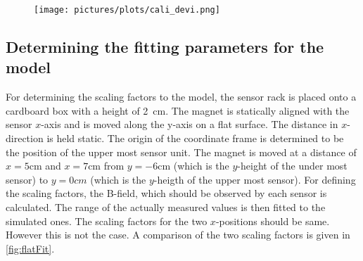 \begin{figure}
\centering
\texttt{[image: pictures/plots/cali\_devi.png]}\label{fig:devi}
\caption{}
\end{figure}





\subsection{Determining the fitting parameters for the model} \label{subsec:resModelFit}

For determining the scaling factors to the model, the sensor rack is placed onto a cardboard box with a height of \SI{2}{\cm}. The magnet is statically aligned with the sensor $ x $-axis and is moved along the y-axis on a flat surface. The distance in $ x $-direction is held static. The origin of the coordinate frame is determined to be the position of the upper most sensor unit. The magnet is moved at a distance of $ x=5\si{\cm} $ and $ x=7\si{\cm} $ from $ y=-6\si{\cm} $ (which is the $ y $-height of the under most sensor) to $ y=0\si{cm} $ (which is the $ y $-heigth of the upper most sensor). For defining the scaling factors, the B-field, which should be observed by each sensor is calculated. The range of the actually measured values is then fitted to the simulated ones. The scaling factors for the two $ x $-positions should be same. However this is not the case. A comparison of the two scaling factors is given in \ref{fig:flatFit}.

